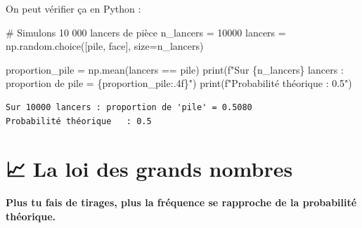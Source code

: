 \documentclass[
  french,
  11pt,
  a4paper,
]{scrbook}
\newenvironment{Shaded}{}{}
\newcommand{\BuiltInTok}[1]{\textcolor[rgb]{0.84,0.23,0.29}{#1}}
\newcommand{\CommentTok}[1]{\textcolor[rgb]{0.42,0.45,0.49}{#1}}
\newcommand{\DecValTok}[1]{\textcolor[rgb]{0.00,0.36,0.77}{#1}}
\newcommand{\NormalTok}[1]{\textcolor[rgb]{0.14,0.16,0.18}{#1}}
\newcommand{\OperatorTok}[1]{\textcolor[rgb]{0.14,0.16,0.18}{#1}}
\newcommand{\SpecialCharTok}[1]{\textcolor[rgb]{0.00,0.36,0.77}{#1}}
\newcommand{\SpecialStringTok}[1]{\textcolor[rgb]{0.01,0.18,0.38}{#1}}
\newcommand{\StringTok}[1]{\textcolor[rgb]{0.01,0.18,0.38}{#1}}
\begin{document}
On peut vérifier ça en Python :

\begin{Shaded}
\begin{Highlighting}[]
\CommentTok{\# Simulons 10 000 lancers de pièce}
\NormalTok{n\_lancers }\OperatorTok{=} \DecValTok{10000}
\NormalTok{lancers }\OperatorTok{=}\NormalTok{ np.random.choice([}\StringTok{\textquotesingle{}pile\textquotesingle{}}\NormalTok{, }\StringTok{\textquotesingle{}face\textquotesingle{}}\NormalTok{], size}\OperatorTok{=}\NormalTok{n\_lancers)}

\NormalTok{proportion\_pile }\OperatorTok{=}\NormalTok{ np.mean(lancers }\OperatorTok{==} \StringTok{\textquotesingle{}pile\textquotesingle{}}\NormalTok{)}
\BuiltInTok{print}\NormalTok{(}\SpecialStringTok{f"Sur }\SpecialCharTok{\{}\NormalTok{n\_lancers}\SpecialCharTok{\}}\SpecialStringTok{ lancers : proportion de \textquotesingle{}pile\textquotesingle{} = }\SpecialCharTok{\{}\NormalTok{proportion\_pile}\SpecialCharTok{:.4f\}}\SpecialStringTok{"}\NormalTok{)}
\BuiltInTok{print}\NormalTok{(}\SpecialStringTok{f"Probabilité théorique   : 0.5"}\NormalTok{)}
\end{Highlighting}
\end{Shaded}

\begin{verbatim}
Sur 10000 lancers : proportion de 'pile' = 0.5080
Probabilité théorique   : 0.5
\end{verbatim}

\section{📈 La loi des grands nombres}\label{la-loi-des-grands-nombres}

\textbf{Plus tu fais de tirages, plus la fréquence se rapproche de la
probabilité théorique.}
\end{document}

